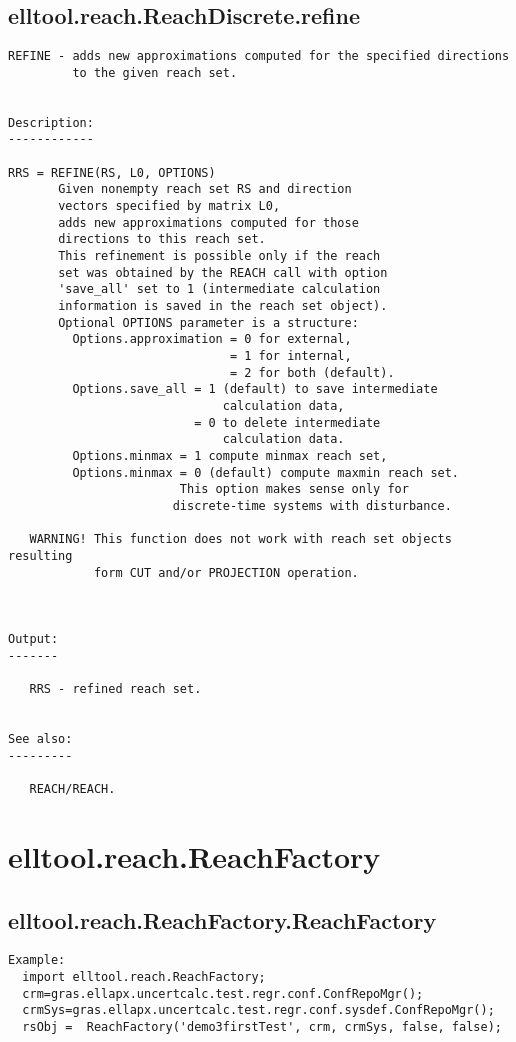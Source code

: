 \subsection{\texorpdfstring{elltool.reach.ReachDiscrete.refine}{refine}}\label{method:elltool.reach.ReachDiscrete.refine}
\begin{verbatim}
REFINE - adds new approximations computed for the specified directions
         to the given reach set.


Description:
------------

RRS = REFINE(RS, L0, OPTIONS)
       Given nonempty reach set RS and direction
       vectors specified by matrix L0,
       adds new approximations computed for those
       directions to this reach set.
       This refinement is possible only if the reach
       set was obtained by the REACH call with option
       'save_all' set to 1 (intermediate calculation
       information is saved in the reach set object).
       Optional OPTIONS parameter is a structure:
         Options.approximation = 0 for external,
                               = 1 for internal,
                               = 2 for both (default).
         Options.save_all = 1 (default) to save intermediate
                              calculation data,
                          = 0 to delete intermediate
                              calculation data.
         Options.minmax = 1 compute minmax reach set,
         Options.minmax = 0 (default) compute maxmin reach set.
                        This option makes sense only for
                       discrete-time systems with disturbance.

   WARNING! This function does not work with reach set objects resulting
            form CUT and/or PROJECTION operation.



Output:
-------

   RRS - refined reach set.


See also:
---------

   REACH/REACH.
\end{verbatim}
\section{elltool.reach.ReachFactory}\label{secClassDescr:elltool.reach.ReachFactory}
\subsection{\texorpdfstring{elltool.reach.ReachFactory.ReachFactory}{ReachFactory}}\label{method:elltool.reach.ReachFactory.ReachFactory}
\begin{verbatim}
Example:
  import elltool.reach.ReachFactory;
  crm=gras.ellapx.uncertcalc.test.regr.conf.ConfRepoMgr();
  crmSys=gras.ellapx.uncertcalc.test.regr.conf.sysdef.ConfRepoMgr();
  rsObj =  ReachFactory('demo3firstTest', crm, crmSys, false, false);
\end{verbatim}
